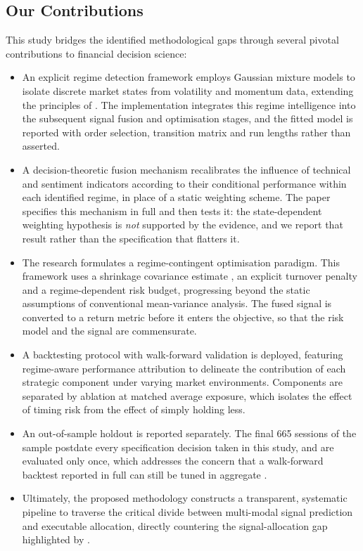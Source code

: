 \subsection{Our Contributions}

This study bridges the identified methodological gaps through several pivotal
contributions to financial decision science:

\begin{itemize}

\item An explicit regime detection framework employs Gaussian mixture models to isolate
discrete market states from volatility and momentum data, extending the principles of
\citet{wang19}. The implementation integrates this regime intelligence into the
subsequent signal fusion and optimisation stages, and the fitted model is reported with
order selection, transition matrix and run lengths rather than asserted.

\item A decision-theoretic fusion mechanism recalibrates the influence of technical and
sentiment indicators according to their conditional performance within each identified
regime, in place of a static weighting scheme. The paper specifies this mechanism in full
and then tests it: the state-dependent weighting hypothesis is \emph{not} supported by
the evidence, and we report that result rather than the specification that flatters it.

\item The research formulates a regime-contingent optimisation paradigm. This framework
uses a shrinkage covariance estimate \citep{ledoit04}, an explicit turnover penalty and a
regime-dependent risk budget, progressing beyond the static assumptions of conventional
mean-variance analysis. The fused signal is converted to a return metric before it enters
the objective, so that the risk model and the signal are commensurate.

\item A backtesting protocol with walk-forward validation is deployed, featuring
regime-aware performance attribution to delineate the contribution of each strategic
component under varying market environments. Components are separated by ablation at
matched average exposure, which isolates the effect of timing risk from the effect of
simply holding less.

\item An out-of-sample holdout is reported separately. The final 665 sessions of the
sample postdate every specification decision taken in this study, and are evaluated only
once, which addresses the concern that a walk-forward backtest reported in full can still
be tuned in aggregate \citep{harvey15,prado16}.

\item Ultimately, the proposed methodology constructs a transparent, systematic pipeline
to traverse the critical divide between multi-modal signal prediction and executable
allocation, directly countering the signal-allocation gap highlighted by
\citet{zhang22}.
\end{itemize}

